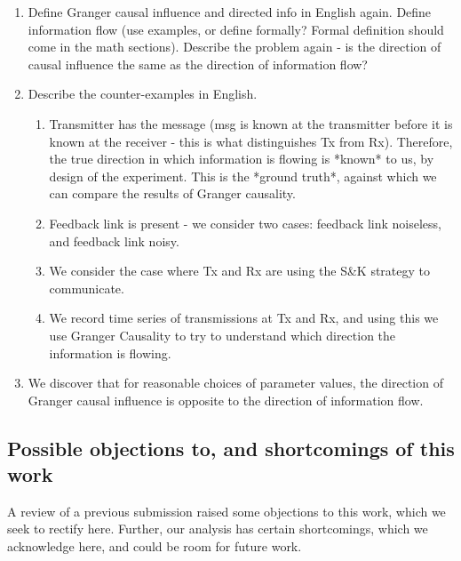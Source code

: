 \documentclass[conference]{IEEEtran}
\begin{document}
\begin{enumerate}
	\item Define Granger causal influence and directed info in English again. Define information flow (use examples, or define formally? Formal definition should come in the math sections). Describe the problem again - is the direction of causal influence the same as the direction of information flow?
	\item Describe the counter-examples in English.
		\begin{enumerate}
			\item Transmitter has the message (msg is known at the transmitter before it is known at the receiver - this is what distinguishes Tx from Rx). Therefore, the true direction in which information is flowing is *known* to us, by design of the experiment. This is the *ground truth*, against which we can compare the results of Granger causality.
			\item Feedback link is present - we consider two cases: feedback link noiseless, and feedback link noisy.
			\item We consider the case where Tx and Rx are using the S\&K strategy to communicate.
			\item We record time series of transmissions at Tx and Rx, and using this we use Granger Causality to try to understand which direction the information is flowing.
		\end{enumerate}
	\item We discover that for reasonable choices of parameter values, the direction of Granger causal influence is opposite to the direction of information flow.
\end{enumerate}

\subsection{Possible objections to, and shortcomings of this work}

A review of a previous submission raised some objections to this work, which we seek to rectify here. Further, our analysis has certain shortcomings, which we acknowledge here, and could be room for future work.
\end{document}
